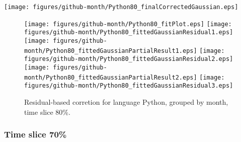 \begin{center}
{\texttt{[image: figures/github-month/Python80\_finalCorrectedGaussian.eps]}}
\end{center}

\FloatBarrier

\begin{figure}[t]
\centering
{}
{\texttt{[image: figures/github-month/Python80\_fitPlot.eps]}}
{\texttt{[image: figures/github-month/Python80\_fittedGaussianResidual1.eps]}}
{\texttt{[image: figures/github-month/Python80\_fittedGaussianPartialResult1.eps]}}
{\texttt{[image: figures/github-month/Python80\_fittedGaussianResidual2.eps]}}
{\texttt{[image: figures/github-month/Python80\_fittedGaussianPartialResult2.eps]}}
{\texttt{[image: figures/github-month/Python80\_fittedGaussianResidual3.eps]}}
\caption{Residual-based corretion for language Python, grouped by month, time slice 80\%.}
\end{figure}


\FloatBarrier


\subsubsection{Time slice 70\%}

